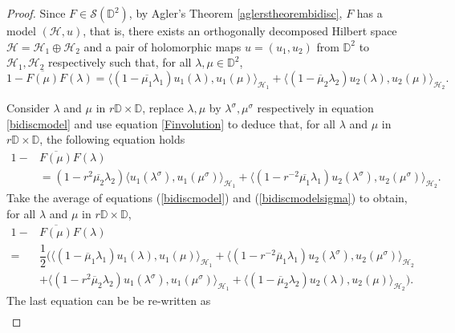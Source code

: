 \documentclass[12pt,reqno]{amsart}
\numberwithin{equation}{section}
\theoremstyle{definition}
\begin{document}
\begin{proof}
Since $F \in \mathcal{S}(\mathbb{D}^{2})$, by Agler's Theorem \ref{aglerstheorembidisc}, $F$ has a model $(\mathcal{H},u)$, that is, there exists an orthogonally decomposed Hilbert space $\mathcal{H}=\mathcal{H}_{1}\oplus\mathcal{H}_{2}$ and a pair of holomorphic maps $u=(u_{1},u_{2})$ from $\mathbb{D}^{2}$ to $\mathcal{H}_{1},\mathcal{H}_{2}$ respectively such that, for all $\lambda, \mu \in \mathbb{D}^{2}$, 
\begin{equation}\label{bidiscmodel}
1-\overline{F(\mu)}{F(\lambda)}=\langle(1-\overline{\mu_{1}}\lambda_{1}) u_{1}({\lambda}),u_{1}({\mu})\rangle_{\mathcal{H}_{1}}+\langle(1-\overline{\mu}_{2}\lambda_{2}) u_{2}({\lambda}),u_{2}({\mu})\rangle_{\mathcal{H}_{2}}.
\end{equation}

Consider $\lambda$ and $\mu$ in $ r\mathbb{D}\times \mathbb{D}$,
replace $\lambda, \mu$ by $\lambda^{\sigma}, \mu^{\sigma}$ respectively in equation \eqref{bidiscmodel} and use equation \eqref{Finvolution} to deduce that, for all $\lambda$ and $ \mu $ in $ r\mathbb{D}\times \mathbb{D}$, the following equation holds
\begin{align}\label{bidiscmodelsigma}
1-&\overline{F(\mu)}{F(\lambda)} \nonumber\\
&=(1-r^{2}\overline{\mu_{2}}\lambda_{2})\langle{u_{1}({\lambda^{\sigma}}),u_{1}({\mu}^{\sigma})\rangle_{\mathcal{H}_{1}}}+\langle{(1-r^{-2}\overline{\mu_{1}}\lambda_{1})u_{2}({\lambda^{\sigma}}),u_{2}({\mu^{\sigma}})\rangle_{\mathcal{H}_{2}}}.
\end{align}
Take the average of equations (\ref{bidiscmodel}) and (\ref{bidiscmodelsigma}) to obtain, for  all $\lambda$ and $\mu$ in $r\mathbb{D}\times\mathbb{D}$, 
\begin{align*}
1-& \overline{F(\mu)}F(\lambda) \\
= & \dfrac{1}{2}\Bigg(\Big\langle(1-\overline\mu_{1}\lambda_{1})u_{1}({\lambda}),u_{1}(\mu)\Big\rangle_{\mathcal{H}_{1}}+ \Big\langle (1-r^{-2}\overline\mu_{1}\lambda_{1})u_{2}({\lambda^{\sigma}}), u_{2}(\mu^{\sigma})\Big\rangle_{\mathcal{H}_{2}} \\
&+  \Big\langle(1-r^{2}\overline{\mu}_{2}\lambda_{2}) u_{1}(\lambda^{\sigma}), u_{1}(\mu^{\sigma})\Big\rangle_{\mathcal{H}_{1}}+\Big\langle(1-\overline{\mu}_{2}\lambda_{2})u_{2}(\lambda), u_{2}(\mu)\Big\rangle_{\mathcal{H}_{2}}\Bigg). 
\end{align*}
The last equation can be  be re-written as
\begin{align}

\end{align}
\end{proof}
\end{document}
